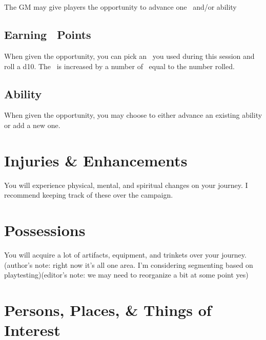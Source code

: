 \section{\advancement\index{\advancement}}\label{sec:advancement}
The GM may give players the opportunity to advance one \attribute\ and/or ability

\subsection{Earning \attribute\ Points}\label{subsec:adv_techniques}
When given the opportunity, you can pick an \attribute\ you used during this session and roll a d10. The \attribute\ is increased by a number of \attrval\ equal to the number rolled.

\subsection{Ability \advancement}\label{subsec:adv_ability}
When given the opportunity, you may choose to either advance an existing ability or add a new one.

\section{Injuries \& Enhancements}\label{sec:adv_injuries}
You will experience physical, mental, and spiritual changes on your journey. I recommend keeping track of these over the campaign.

\section{Possessions}\label{sec:possessions}
You will acquire a lot of artifacts, equipment, and trinkets over your journey. (author's note: right now it's all one area. I'm considering segmenting based on playtesting)(editor's note: we may need to reorganize a bit at some point yes)

\section{Persons, Places, \& Things of Interest}\label{sec:interests}
	